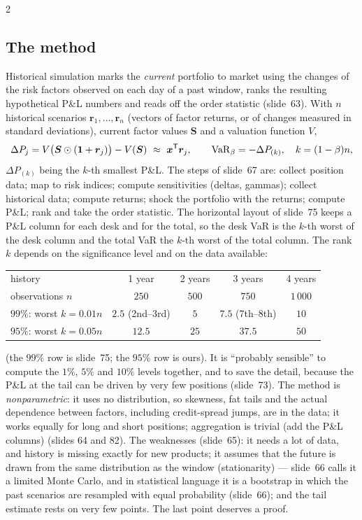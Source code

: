 \begin{paracol}{2}
\subsection{The method}
Historical simulation marks the \emph{current} portfolio to market using the changes of the risk factors observed on each day of a past window, ranks the resulting hypothetical P\&L numbers and reads off the order statistic (slide~63). With $n$ historical scenarios $\bm r_1,\dots,\bm r_n$ (vectors of factor returns, or of changes measured in standard deviations), current factor values $\bm S$ and a valuation function $V$,
\[
  \Delta P_j=V\bigl(\bm S\odot(\bm 1+\bm r_j)\bigr)-V(\bm S)\ \approx\ \bm x^{\mathsf T}\bm r_j,\qquad
  \mathrm{VaR}_\beta=-\Delta P_{(k)},\quad k=(1-\beta)n,
\]
$\Delta P_{(k)}$ being the $k$-th smallest P\&L. The steps of slide~67 are: collect position data; map to risk indices; compute sensitivities (deltas, gammas); collect historical data; compute returns; shock the portfolio with the returns; compute P\&L; rank and take the order statistic. The horizontal layout of slide~75 keeps a P\&L column for each desk and for the total, so the desk VaR is the $k$-th worst of the desk column and the total VaR the $k$-th worst of the total column. The rank $k$ depends on the significance level and on the data available:
\begin{center}\footnotesize
\begin{tabular}{@{}lcccc@{}}
\toprule
history & 1 year & 2 years & 3 years & 4 years\\
observations $n$ & $250$ & $500$ & $750$ & $1\,000$\\
$99\%$: worst $k=0.01n$ & $2.5$ (2nd--3rd) & $5$ & $7.5$ (7th--8th) & $10$\\
$95\%$: worst $k=0.05n$ & $12.5$ & $25$ & $37.5$ & $50$\\
\bottomrule
\end{tabular}
\end{center}
(the $99\%$ row is slide~75; the $95\%$ row is ours). It is ``probably sensible'' to compute the $1\%$, $5\%$ and $10\%$ levels together, and to save the detail, because the P\&L at the tail can be driven by very few positions (slide~73). The method is \emph{nonparametric}: it uses no distribution, so skewness, fat tails and the actual dependence between factors, including credit-spread jumps, are in the data; it works equally for long and short positions; aggregation is trivial (add the P\&L columns) (slides 64 and 82).
The weaknesses (slide~65): it needs a lot of data, and history is missing exactly for new products; it assumes that the future is drawn from the same distribution as the window (stationarity) --- slide~66 calls it a limited Monte Carlo, and in statistical language it is a bootstrap in which the past scenarios are resampled with equal probability (slide~66); and the tail estimate rests on very few points. The last point deserves a proof.


\end{paracol}
